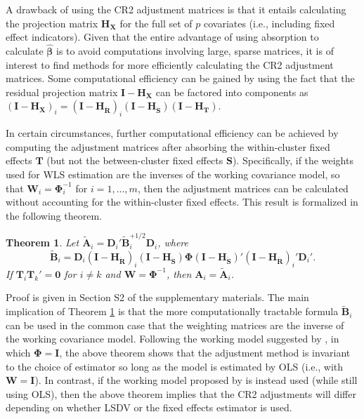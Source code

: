\documentclass[12pt]{article}\usepackage[]{graphicx}\usepackage[]{color}
\newtheorem{thm}{Theorem}
\newcommand{\bm}{\mathbf}
\newcommand{\bs}{\boldsymbol}
\begin{document}
A drawback of using the CR2 adjustment matrices is that it entails calculating the projection matrix $\bm{H_X}$ for the full set of $p$ covariates (i.e., including fixed effect indicators). 
Given that the entire advantage of using absorption to calculate $\hat{\bs\beta}$ is to avoid computations involving large, sparse matrices, it is of interest to find methods for more efficiently calculating the CR2 adjustment matrices. 
Some computational efficiency can be gained by using the fact that the residual projection matrix $\bm{I} - \bm{H_X}$ can be factored into components as $\left(\bm{I} - \bm{H_X}\right)_i = \left(\bm{I} - \bm{H_{\ddot{R}}}\right)_i \left(\bm{I} - \bm{H_{\ddot{S}}}\right) \left(\bm{I} - \bm{H_T}\right)$.

In certain circumstances, further computational efficiency can be achieved by computing the adjustment matrices after absorbing the within-cluster fixed effects $\bm{T}$ (but not the between-cluster fixed effects $\bm{S}$). 
Specifically, if the weights used for WLS estimation are the inverses of the working covariance model, so that $\bm{W}_i = \bs\Phi_i^{-1}$ for $i = 1,...,m$, then the adjustment matrices can be calculated without accounting for the within-cluster fixed effects. 
This result is formalized in the following theorem.  

\begin{thm}
\label{thm:absorb}
Let $\bm{\tilde{A}}_i = \bm{D}_i'\bm{\tilde{B}}_i^{+1/2} \bm{D}_i$, where 
\begin{equation}
\label{eq:CR2_B_tilde}
\bm{\tilde{B}}_i = \bm{D}_i\left(\bm{I} - \bm{H_{\ddot{R}}}\right)_i \left(\bm{I} - \bm{H_{\ddot{S}}}\right) \bs\Phi \left(\bm{I} - \bm{H_{\ddot{S}}}\right)' \left(\bm{I} - \bm{H_{\ddot{R}}}\right)_i' \bm{D}_i'.
\end{equation}
If $\bm{T}_i \bm{T}_k' = \bm{0}$ for $i \neq k$ and $\bm{W} = \bs\Phi^{-1}$, then $\bm{A}_i = \bm{\tilde{A}}_i$. 
\end{thm}

Proof is given in Section S2 of the supplementary materials.
The main implication of Theorem \ref{thm:absorb} is that the more computationally tractable formula $\bm{\tilde{B}}_i$ can be used in the common case that the weighting matrices are the inverse of the working covariance model.
Following the working model suggested by \citet{Bell2002bias}, in which $\bs\Phi = \bm{I}$, the above theorem shows that the adjustment method is invariant to the choice of estimator so long as the model is estimated by OLS (i.e., with $\bm{W} = \bm{I}$).
In contrast, if the working model proposed by \citet{Imbens2015robust} is instead used (while still using OLS), then the above theorem implies that the CR2 adjustments will differ depending on whether LSDV or the fixed effects estimator is used.
\end{document}
